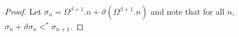 \documentclass[UKenglish,cleveref,DIV=12]{scrartcl}
\theoremstyle{definition}
\theoremstyle{definition}
\begin{document}
\begin{proof}
%
%
%
%
Let \( \sigma_n = \Omega^{\beta +1}.n + \vartheta(\Omega^{\beta+1}.n) \) and note that for all \( n \), \( \sigma_n + \vartheta \sigma_n <^* \sigma_{n+1} \).


\end{proof}
\end{document}
